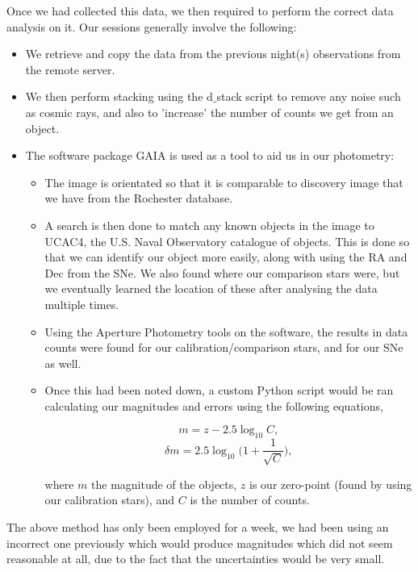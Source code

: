 \documentclass[twocolumn]{revtex4}
\begin{document}
Once we had collected this data, we then required to perform the correct data analysis on it. Our sessions generally involve the following: 
\begin{itemize}
 \item We retrieve and copy the data from the previous night(s) observations from the remote server.
 \item We then perform stacking using the d$\_$stack script to remove any noise such as cosmic rays, and also to 'increase' the number of counts we get from an object. 
 \item The software package GAIA is used as a tool to aid us in our photometry:
 	\begin{itemize}
 	 \item The image is orientated so that it is comparable to discovery image that we have from the Rochester database.
	 \item A search is then done to match any known objects in the image to UCAC4, the U.S. Naval Observatory catalogue of objects. This is done so that we can identify our object more easily, along with using the RA and Dec from the SNe. We also found where our comparison stars were, but we eventually learned the location of these after analysing the data multiple times.
	 \item Using the Aperture Photometry tools on the software, the results in data counts were found for our calibration/comparison stars, and for our SNe as well.
	 \item Once this had been noted down, a custom Python script would be ran calculating our magnitudes and errors using the following equations,
	 
	 \begin{equation}
	 m = z - 2.5 \log_{10}{C},
	 \end{equation}
	 \begin{equation}
	 \delta{m} = 2.5 \log_{10}{\Big(1+\frac{1}{\sqrt{C}}\Big)},
	 \end{equation}
	 
	 where $m$ the magnitude of the objects, $z$ is our zero-point (found by using our calibration stars), and $C$ is the number of counts. 
	 
	\end{itemize}

\end{itemize}

The above method has only been employed for a week, we had been using an incorrect one previously which would produce magnitudes which did not seem reasonable at all, due to the fact that the uncertainties would be very small.
\end{document}
